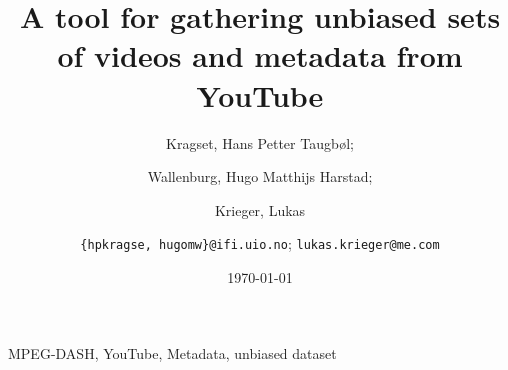 \documentclass[10pt,journal]{IEEEtran}
\title{A tool for gathering unbiased sets of videos and metadata from YouTube}
\author{
    Kragset, Hans Petter Taugb\o l;
    \and
    Wallenburg, Hugo Matthijs Harstad;
    \and
    Krieger, Lukas
    \and
    \newline
    \texttt{\{hpkragse, hugomw\}@ifi.uio.no};
    \texttt{lukas.krieger@me.com}
}
\date{\today}
\begin{document}
\maketitle



\begin{IEEEkeywords}
    MPEG-DASH, YouTube, Metadata, unbiased dataset
\end{IEEEkeywords}





















\end{document}
